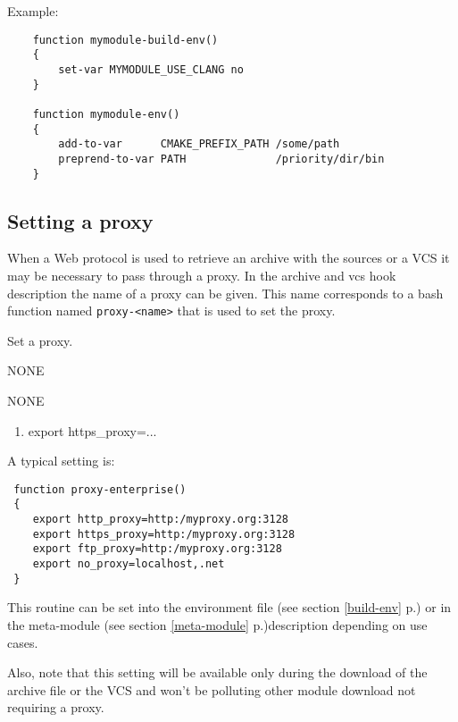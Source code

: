 \documentclass[a4paper,12pt,twoside]{article}
\newcommand{\code}[1]{\texttt{#1}}
\newcommand{\seeref}[1]{see section \ref{#1} p.\pageref{#1}}
\begin{document}
Example:

\begin{lstlisting}
	function mymodule-build-env()
	{
		set-var MYMODULE_USE_CLANG no
	}

	function mymodule-env()
	{
		add-to-var      CMAKE_PREFIX_PATH /some/path
		preprend-to-var PATH              /priority/dir/bin
	}
\end{lstlisting}

\subsection{Setting a proxy}
\label{proxy}

When a Web protocol is used to retrieve an archive with the sources or a VCS it may be necessary to pass through a proxy. In the archive and vcs hook description the name of a proxy can be given. This name corresponds to a bash function named \code{proxy-<name>} that is used to set the proxy.

\begin{description}[style=nextline]
	\item[proxy-<name>] Set a proxy.
	\begin{description}[font=\textit,style=standard]
		\item[parameter] \tabto{2cm} NONE
		\item[return] \tabto{2cm} NONE
		\begin{enumerate}
			\item export https\_proxy=...
		\end{enumerate}
	\end{description}
\end{description}

A typical setting is:

\begin{lstlisting}
 function proxy-enterprise()
 {
    export http_proxy=http:/myproxy.org:3128
    export https_proxy=http:/myproxy.org:3128
    export ftp_proxy=http:/myproxy.org:3128
    export no_proxy=localhost,.net
 }
\end{lstlisting}

This routine can be set into the environment file (\seeref{build-env}) or in the meta-module (\seeref{meta-module})description depending on use cases.

Also, note that this setting will be available only during the download of the archive file or the VCS and won't be polluting other module download not requiring a proxy.
\end{document}

